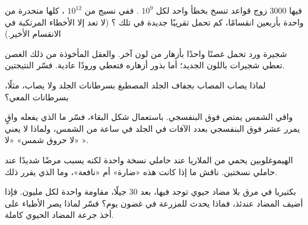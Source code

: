 \begin{exercise}[$\star\star$]\label{exo:g11:mutations:9}
 فيها \num{3000} زوج قواعد تنسخ بخطأ واحد لكل $10^9$ .
ففي نسيج من $10^{12}$ ، كلها منحدرة من  واحدة بأربعين انقسامًا،
كم  تحمل تقريبًا  جديدة في تلك ؟ (لا تعد إلا الأخطاء
المرتكبة في الانقسام الأخير.)
\end{exercise}

\begin{exercise}[$\star\star$]\label{exo:g11:mutations:10}
شجيرة ورد تحمل غصنًا واحدًا بأزهار من لون آخر. والعقل المأخوذة من ذلك
الغصن تعطي شجيرات باللون الجديد؛ أما بذور أزهاره فتعطي ورودًا عادية.
فسّر النتيجتين.
\end{exercise}

\begin{exercise}[$\star\star$]\label{exo:g11:mutations:11}
لماذا يصاب المصاب بجفاف الجلد المصطبغ بسرطانات الجلد ولا يصاب، مثلًا،
بسرطانات المعي؟
\end{exercise}

\begin{exercise}[$\star\star\star$]\label{exo:g11:mutations:12}
واقي الشمس يمتص فوق البنفسجي. باستعمال شكل البقاء، فسّر ما الذي يفعله
واقٍ يمرر عشر فوق البنفسجي بعدد الآفات في  الجلد في ساعة من الشمس،
ولماذا لا يعني «لا حروق شمس» «لا ».
\end{exercise}

\begin{exercise}[$\star\star\star$]\label{exo:g11:mutations:13}
  الهيموغلوبين يحمي من الملاريا عند حاملي نسخة واحدة لكنه
يسبب مرضًا شديدًا عند حاملي نسختين. ناقش ما إذا كانت هذه  «ضارة»
أم «نافعة»، وما الذي يقرر ذلك.
\end{exercise}

\begin{exercise}[$\star\star\star$]\label{exo:g11:mutations:14}
بكتيريا في مرق بلا مضاد حيوي توجد فيها، بعد 30 جيلًا،  مقاومة
واحدة لكل مليون. فإذا أضيف المضاد عندئذ، فماذا يحدث للمزرعة في غضون
يوم؟ فسّر لماذا يصر الأطباء على أخذ جرعة المضاد الحيوي كاملة.
\end{exercise}

